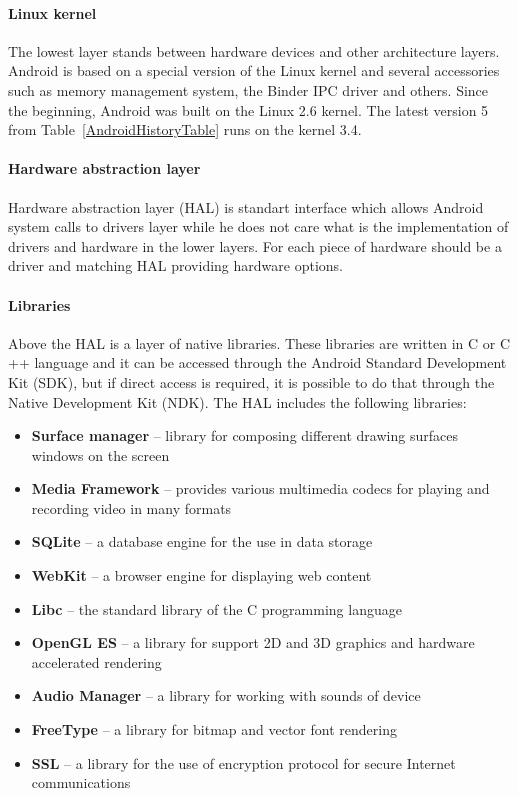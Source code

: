 \paragraph{Linux kernel}
The lowest layer stands between hardware devices and other architecture layers. Android is based on a special version of
the Linux kernel and several accessories such as memory management system, the Binder IPC driver and others. Since the
beginning, Android was built on the Linux 2.6 kernel. The latest version 5 from Table~\ref{AndroidHistoryTable} runs on
the kernel 3.4.

\paragraph{Hardware abstraction layer}
Hardware abstraction layer (HAL) is standart interface which allows Android system calls to drivers layer while he does not care what is the implementation of drivers and hardware in the lower layers. For each piece of hardware should be a driver and matching HAL providing hardware options.

\paragraph{Libraries}
Above the HAL is a layer of native libraries. These libraries are written in C or C ++ language and it can be accessed through the Android Standard Development Kit (SDK), but if direct access is required, it is possible to do that through the Native Development Kit (NDK). The HAL includes the following libraries:

\begin{itemize}
\item \textbf{Surface manager} -- library for composing different drawing surfaces windows on the screen
\item \textbf{Media Framework} -- provides various multimedia codecs for playing and recording video in many formats
\item \textbf{SQLite} -- a database engine for the use in data storage
\item \textbf{WebKit} -- a browser engine for displaying web content
\item \textbf{Libc} -- the standard library of the C programming language
\item \textbf{OpenGL ES} -- a library for support 2D and 3D graphics and hardware accelerated rendering
\item \textbf{Audio Manager} -- a library for working with sounds of device
\item \textbf{FreeType} -- a library for bitmap and vector font rendering
\item \textbf{SSL} -- a library for the use of encryption protocol for secure Internet communications
\end{itemize}

